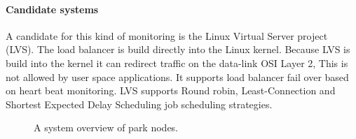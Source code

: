 \paragraph{Candidate systems}
A candidate for this kind of monitoring is the Linux Virtual Server project \cite{zhang2000linuxVirtualServer} (LVS).
The load balancer is build directly into the Linux kernel.
Because LVS is build into the kernel it can redirect traffic on the data-link OSI Layer 2, This is not allowed by user space applications.
It supports load balancer fail over based on heart beat monitoring.
LVS supports  Round robin, Least-Connection and Shortest Expected Delay Scheduling job scheduling strategies.



\begin{figure}
	\centering
	\scalebox{0.7}{}
	\caption[System overview from the load balancer viewpoint]{
		\label{fig:parkOverview} 
		\footnotesize{%
			A system overview of park nodes.
		}
	}
\end{figure}





